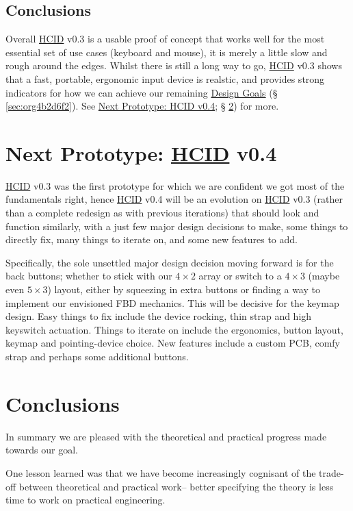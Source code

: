 \documentclass[logo,bsc,singlespacing,parskip]{infthesis}
\begin{document}
\section{Conclusions}
\label{sec:org2e3b899}
Overall \hyperref[org917851e]{HCID} v0.3 is a usable proof of concept that works well for the most essential set of use cases (keyboard and mouse), it is merely a little slow and rough around the edges.
Whilst there is still a long way to go, \hyperref[org917851e]{HCID} v0.3 shows that a fast, portable, ergonomic input device is realstic, and provides strong indicators for how we can achieve our remaining \hyperref[sec:org4b2d6f2]{Design Goals} (§ \ref{sec:org4b2d6f2}). See \hyperref[sec:orgb659b1f]{Next Prototype: HCID v0.4}; § \ref{sec:orgb659b1f}) for more.

\chapter{Next Prototype: \hyperref[org917851e]{HCID} v0.4}
\label{sec:orgb659b1f}
\hyperref[org917851e]{HCID} v0.3 was the first prototype for which we are confident we got most of the fundamentals right, hence \hyperref[org917851e]{HCID} v0.4 will be an evolution on \hyperref[org917851e]{HCID} v0.3 (rather than a complete redesign as with previous iterations) that should look and function similarly, with a just few major design decisions to make, some things to directly fix, many things to iterate on, and some new features to add.

Specifically, the sole unsettled major design decision moving forward is for the back buttons; whether to stick with our \(4\times2\) array or switch to a \(4\times3\) (maybe even \(5\times3\)) layout, either by squeezing in extra buttons or finding a way to implement our envisioned FBD mechanics. This will be decisive for the keymap design.
Easy things to fix include the device rocking, thin strap and high keyswitch actuation. Things to iterate on include the ergonomics, button layout, keymap and pointing-device choice. New features include a custom PCB, comfy strap and perhaps some additional buttons.
\chapter{Conclusions}
\label{sec:org469e9db}
In summary we are pleased with the theoretical and practical progress made towards our goal.

One lesson learned was that we have become increasingly cognisant of the trade-off between theoretical and practical work-- better specifying the theory is less time to work on practical engineering.
\end{document}
